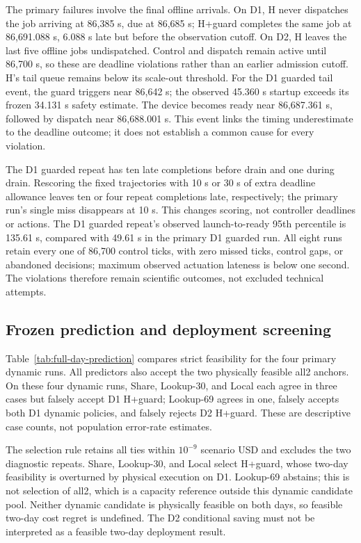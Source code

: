 The primary failures involve the final offline arrivals. On D1, H never
dispatches the job arriving at 86,385 s, due at 86,685 s; H+guard completes
the same job at 86,691.088 s, 6.088 s late but before the observation cutoff.
On D2, H leaves the last five offline jobs undispatched.
Control and dispatch remain active until 86,700 s, so these are deadline
violations rather than an earlier admission cutoff.
H's tail queue remains below its scale-out threshold.
For the D1 guarded tail event, the guard triggers near 86,642 s;
the observed 45.360 s startup exceeds its frozen 34.131 s safety estimate.
The device becomes ready near 86,687.361 s, followed by dispatch near
86,688.001 s. This event links the timing underestimate to the deadline outcome;
it does not establish a common cause for every violation.

The D1 guarded repeat has ten late completions before drain and one during drain.
Rescoring the fixed trajectories with 10 s or 30 s of extra deadline allowance
leaves ten or four repeat completions late, respectively; the primary run's
single miss disappears at 10 s. This changes scoring, not controller deadlines
or actions.
The D1 guarded repeat's observed launch-to-ready 95th percentile is 135.61 s, compared with
49.61 s in the primary D1 guarded run. All eight runs retain every one of
86,700 control ticks, with zero missed ticks, control gaps, or abandoned
decisions; maximum observed actuation lateness is below one second.
The violations therefore remain scientific outcomes, not excluded technical
attempts.

\subsection{Frozen prediction and deployment screening}
Table~\ref{tab:full-day-prediction} compares strict feasibility for the four
primary dynamic runs. All predictors also accept the two physically feasible
all2 anchors. On these four dynamic runs, Share, Lookup-30, and Local each
agree in three cases but falsely accept D1 H+guard; Lookup-69 agrees in one,
falsely accepts both D1 dynamic policies, and falsely rejects D2 H+guard.
These are descriptive case counts, not population error-rate estimates.

The selection rule retains all ties within $10^{-9}$ scenario USD and excludes
the two diagnostic repeats. Share, Lookup-30, and Local select H+guard,
whose two-day feasibility is overturned by physical execution on D1.
Lookup-69 abstains; this is not selection of all2, which is a capacity
reference outside this dynamic candidate pool. Neither dynamic candidate
is physically feasible on both days, so feasible two-day cost regret is
undefined. The D2 conditional saving must not be interpreted as a feasible
two-day deployment result.


